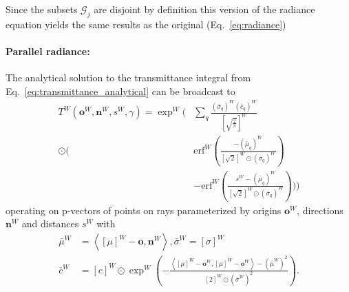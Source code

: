 \documentclass[a4paper, 11pt]{memoir}
\newcommand*{\erf}{\text{erf}}
\begin{document}
    Since the subsets $\mathcal{G}_j$ are disjoint by definition this version of the \gls{radiance} equation yields the same results as the original (Eq.~\eqref{eq:radiance})

    \paragraph{Parallel \gls{radiance}:}
    \label{par:parallel_radiance}
    The analytical solution to the \gls{transmittance} integral from Eq.~\eqref{eq:transmittance_analytical} can be broadcast
    to
    \begin{equation}
        \begin{aligned}
            T^W(\mathbf{o}^W, \mathbf{n}^W, s^W, \gamma) = \exp^W\Bigg(& \sum_q \frac{(\bar{\sigma}_q)^W
            (\bar{c}_q)^W}{\left[ \sqrt{\frac{2}{\pi}} \right]^W} \\
            \odot \Bigg(& \erf^W{\left( \frac{-(\bar{\mu}_q)^W}{[ \sqrt{2} ]^W \odot (\bar{\sigma}_q)^W} \right)}\\
            &- \erf^W{\left( \frac{s^W - (\bar{\mu}_q)^W}{[ \sqrt{2} ]^W \odot (\bar{\sigma}_q)^W} \right)} \Bigg) \Bigg)
        \end{aligned}
        \label{eq:transmittance_broadcast}
    \end{equation}
    operating on p-vectors of points on rays parameterized by origins $\mathbf{o}^W$, directions $\mathbf{n}^W$
    and distances $s^W$ with
    \begin{align*}
        \bar{\mu}^W &= \left\langle [ \mu ]^W - \mathbf{o}, \mathbf{n}^W \right\rangle, \bar{\sigma}^W = \left[ \sigma \right]^W\\
        \bar{c}^W &= [c]^W \odot \exp^W{\left( - \frac{\left\langle [\mu]^W - \mathbf{o}^W, [\mu]^W - \mathbf{o}^W \right\rangle
    - \left(\bar{\mu}^W\right)^2}{[2]^W \odot \left(\bar{\sigma}^W\right)^2} \right)}.
    \end{align*}
\end{document}
